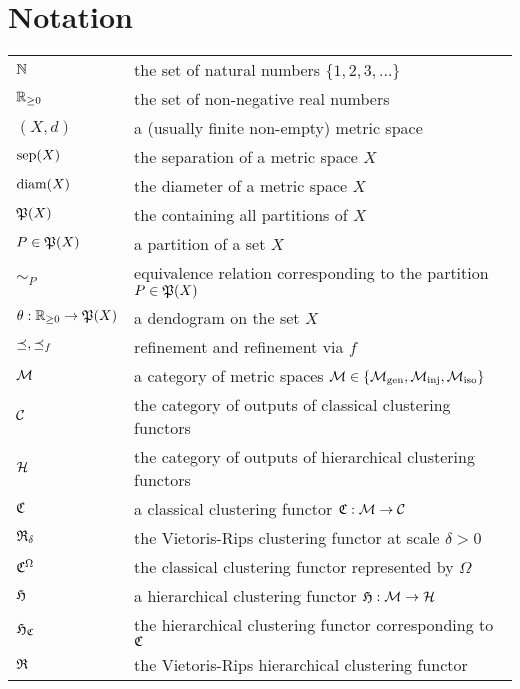 \chapter{Notation}
\begin{tabular}{ll}
$\N$ & the set of natural numbers $\{1, 2, 3, \dots \}$\\
$\R_{\geq0}$ & the set of non-negative real numbers\\

$(X,d)$ & a (usually finite non-empty) metric space\\
$\sep(X)$ & the separation of a metric space $X$\\
$\diam(X)$ & the diameter of a metric space $X$\\

$\P(X)$ & the containing all partitions of $X$\\
$P \in \P(X)$ & a partition of a set $X$\\
$\sim_P$ & equivalence relation corresponding to the partition $P \in \P(X)$\\

$\theta: \R_{\geq0} \to \P(X)$ & a dendogram on the set $X$\\

$\refines, \refines_f$ & refinement and refinement via $f$\\

$\M$ & a category of metric spaces $\M \in \{\gen, \inj, \iso\}$\\
$\C$ & the category of outputs of classical clustering functors\\
$\H$ & the category of outputs of hierarchical clustering functors\\

$\Cf$ & a classical clustering functor $\Cf: \M \to \C$\\
$\Rf_\delta$ & the Vietoris-Rips clustering functor at scale $\delta>0$\\
$\Cf^\Omega$ & the classical clustering functor represented by $\Omega$\\

$\Hf$ & a hierarchical clustering functor $\Hf: \M \to \H$\\
$\Hf_\Cf$ & the hierarchical clustering functor corresponding to $\Cf$\\
$\Rf$ & the Vietoris-Rips hierarchical clustering functor\\

\end{tabular}